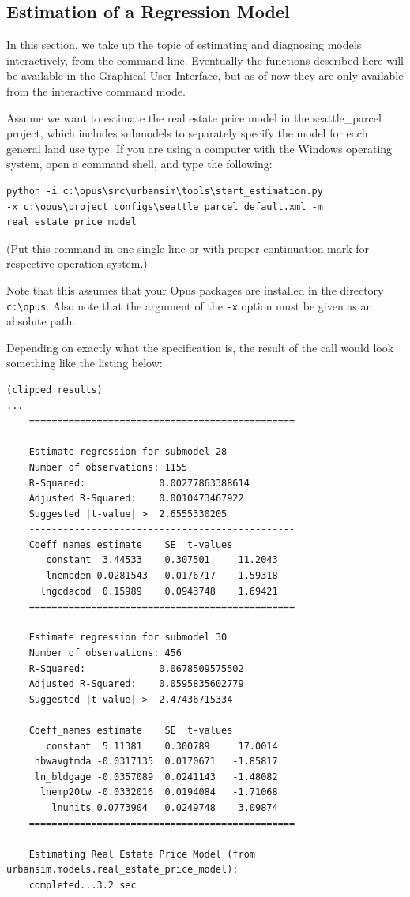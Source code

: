 \subsection{Estimation of a Regression Model}

In this section, we take up the topic of estimating and diagnosing models
interactively, from the command line.  Eventually the functions described
here will be available in the Graphical User Interface, but as of now they
are only available from the interactive command mode.

Assume we want to estimate the real estate price model in the
seattle\_parcel project, which includes submodels to separately specify the
model for each general land use type.  If you are using a computer with the
Windows operating system, open a command shell, and type the following:

\begin{verbatim}
python -i c:\opus\src\urbansim\tools\start_estimation.py 
-x c:\opus\project_configs\seattle_parcel_default.xml -m real_estate_price_model
\end{verbatim}
(Put this command in one single line or with proper continuation
mark for respective operation system.)

Note that this assumes that your Opus packages are installed in the directory \verb|c:\opus|. 
Also note that the argument of the \verb|-x| option must be given as an absolute path.  

Depending on exactly what the specification is, the result of the call 
would look something like the listing below:
\\

\begin{verbatim}
(clipped results)
...
    ===============================================

    Estimate regression for submodel 28
    Number of observations: 1155
    R-Squared:             0.00277863388614
    Adjusted R-Squared:    0.0010473467922
    Suggested |t-value| >  2.6555330205
    -----------------------------------------------
    Coeff_names	estimate	SE	t-values
       constant	 3.44533	0.307501	 11.2043
       lnempden	0.0281543	0.0176717	 1.59318
      lngcdacbd	 0.15989	0.0943748	 1.69421
    ===============================================

    Estimate regression for submodel 30
    Number of observations: 456
    R-Squared:             0.0678509575502
    Adjusted R-Squared:    0.0595835602779
    Suggested |t-value| >  2.47436715334
    -----------------------------------------------
    Coeff_names	estimate	SE	t-values
       constant	 5.11381	0.300789	 17.0014
     hbwavgtmda	-0.0317135	0.0170671	-1.85817
     ln_bldgage	-0.0357089	0.0241143	-1.48082
      lnemp20tw	-0.0332016	0.0194084	-1.71068
        lnunits	0.0773904	0.0249748	 3.09874
    ===============================================

    Estimating Real Estate Price Model (from urbansim.models.real_estate_price_model): 
    completed...3.2 sec
\end{verbatim}

